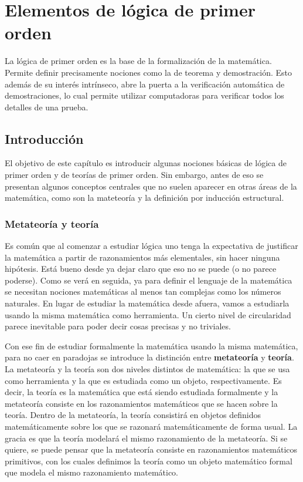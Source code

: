 \documentclass[a4paper, 12pt]{report}
\theoremstyle{definition}
\begin{document}
\tableofcontents

\chapter{Elementos de lógica de primer orden}

La lógica de primer orden es la base de la formalización de la matemática. Permite definir precisamente nociones como la de teorema y demostración. Esto además de su interés intrínseco, abre la puerta a la verificación automática de demostraciones, lo cual permite utilizar computadoras para verificar todos los detalles de una prueba.

\section{Introducción}

El objetivo de este capítulo es introducir algunas nociones básicas de lógica de primer orden y de teorías de primer orden. Sin embargo, antes de eso se presentan algunos conceptos centrales que no suelen aparecer en otras áreas de la matemática, como son la mateteoría y la definición por inducción estructural.

\subsection{Metateoría y teoría}

Es común que al comenzar a estudiar lógica uno tenga la expectativa de justificar la matemática a partir de razonamientos más elementales, sin hacer ninguna hipótesis. Está bueno desde ya dejar claro que eso no se puede (o no parece poderse). Como se verá en seguida, ya para definir el lenguaje de la matemática se necesitan nociones matemáticas al menos tan complejas como los números naturales. En lugar de estudiar la matemática desde afuera, vamos a estudiarla usando la misma matemática como herramienta. Un cierto nivel de circularidad parece inevitable para poder decir cosas precisas y no triviales.

Con ese fin de estudiar formalmente la matemática usando la misma matemática, para no caer en paradojas se introduce la distinción entre \textbf{metateoría} y \textbf{teoría}. La metateoría y la teoría son dos niveles distintos de matemática: la que se usa como herramienta y la que es estudiada como un objeto, respectivamente. Es decir, la teoría es la matemática que está siendo estudiada formalmente y la metateoría consiste en los razonamientos matemáticos que se hacen sobre la teoría. Dentro de la metateoría, la teoría consistirá en objetos definidos matemáticamente sobre los que se razonará matemáticamente de forma usual. La gracia es que la teoría modelará el mismo razonamiento de la metateoría. Si se quiere, se puede pensar que la metateoría consiste en razonamientos matemáticos primitivos, con los cuales definimos la teoría como un objeto matemático formal que modela el mismo razonamiento matemático.
\end{document}
